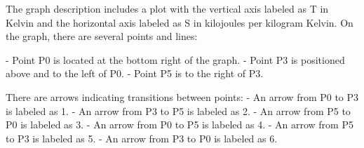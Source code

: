 The graph description includes a plot with the vertical axis labeled as T in Kelvin and the horizontal axis labeled as S in kilojoules per kilogram Kelvin. On the graph, there are several points and lines:

- Point P0 is located at the bottom right of the graph.
- Point P3 is positioned above and to the left of P0.
- Point P5 is to the right of P3.

There are arrows indicating transitions between points:
- An arrow from P0 to P3 is labeled as 1.
- An arrow from P3 to P5 is labeled as 2.
- An arrow from P5 to P0 is labeled as 3.
- An arrow from P0 to P5 is labeled as 4.
- An arrow from P5 to P3 is labeled as 5.
- An arrow from P3 to P0 is labeled as 6.